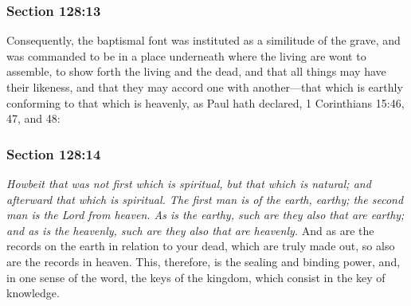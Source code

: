 	\subsubsection{Section 128:13} %
		\label{DC128-13}

		Consequently, the baptismal font was instituted as a similitude of the grave, and was commanded to be in a place underneath where the living are wont to assemble, to show forth the living and the dead, and that all things may have their likeness, and that they may accord one with another---that which is earthly conforming to that which is heavenly, as Paul hath declared, 1 Corinthians 15:46, 47, and 48:


	\subsubsection{Section 128:14} %
		\label{DC128-14}

		\textit{Howbeit that was not first which is spiritual, but that which is natural; and afterward that which is spiritual. The first man is of the earth, earthy; the second man is the Lord from heaven. As is the earthy, such are they also that are earthy; and as is the heavenly, such are they also that are heavenly.} And as are the records on the earth in relation to your dead, which are truly made out, so also are the records in heaven. This, therefore, is the sealing and binding power, and, in one sense of the word, the keys of the kingdom, which consist in the key of knowledge. 	



